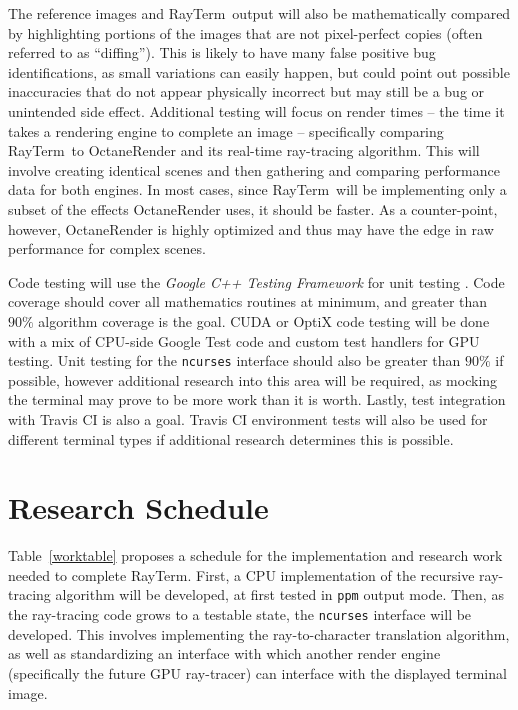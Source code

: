 \documentclass[11pt]{article}
\newcommand{\name}{{\sc RayTerm}}
\begin{document}
The reference images and \name\ output will also be mathematically compared by highlighting portions of the images that are not pixel-perfect copies (often referred to as ``diffing'').
This is likely to have many false positive bug identifications, as small variations can easily happen, but could point out possible inaccuracies that do not appear physically incorrect but may still be a bug or unintended side effect.
Additional testing will focus on render times -- the time it takes a rendering engine to complete an image -- specifically comparing \name\ to OctaneRender \cite{octane} and its real-time ray-tracing algorithm.
This will involve creating identical scenes and then gathering and comparing performance data for both engines.
In most cases, since \name\ will be implementing only a subset of the effects OctaneRender uses, it should be faster.
As a counter-point, however, OctaneRender is highly optimized and thus may have the edge in raw performance for complex scenes.

Code testing will use the {\it Google C++ Testing Framework} for unit testing \cite{googletest}.
Code coverage should cover all mathematics routines at minimum, and greater than $90\%$ algorithm coverage is the goal.
CUDA or OptiX code testing will be done with a mix of CPU-side Google Test code and custom test handlers for GPU testing.
Unit testing for the \texttt{ncurses} interface should also be greater than $90\%$ if possible, however additional research into this area will be required, as mocking the terminal may prove to be more work than it is worth.
Lastly, test integration with Travis CI is also a goal.
Travis CI environment tests will also be used for different terminal types if additional research determines this is possible.

\section{Research Schedule}
\label{sec:schedule}


Table~\ref{worktable} proposes a schedule for the implementation and research work needed to complete \name.
First, a CPU implementation of the recursive ray-tracing algorithm will be developed, at first tested in \texttt{ppm} output mode.
Then, as the ray-tracing code grows to a testable state, the \texttt{ncurses} interface will be developed.
This involves implementing the ray-to-character translation algorithm, as well as standardizing an interface with which another render engine (specifically the future GPU ray-tracer) can interface with the displayed terminal image.
\end{document}
